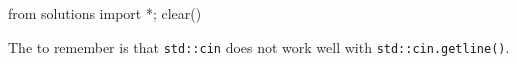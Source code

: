 \begin{python0}
from solutions import *; clear()
\end{python0}

The  to remember is that \texttt{std::cin} does not work well with \texttt{std::cin.getline()}.


